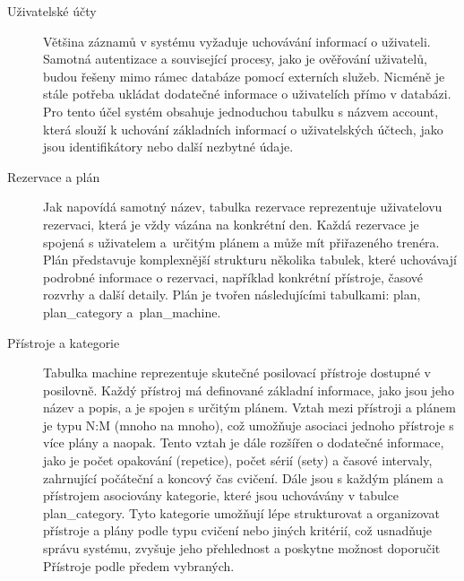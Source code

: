 \begin{description}
    \item[Uživatelské účty] Většina záznamů v systému vyžaduje uchovávání informací o uživateli. Samotná autentizace a související procesy, jako je ověřování uživatelů, budou řešeny mimo rámec databáze pomocí externích služeb. Nicméně je stále potřeba ukládat dodatečné informace o uživatelích přímo v databázi. Pro tento účel systém obsahuje jednoduchou tabulku s názvem account, která slouží k uchování základních informací o uživatelských účtech, jako jsou identifikátory nebo další nezbytné údaje.
    \item[Rezervace a plán] Jak napovídá samotný název, tabulka rezervace reprezentuje uživatelovu rezervaci, která je vždy vázána na konkrétní den. Každá rezervace je spojená s uživatelem a~určitým plánem a může mít přiřazeného trenéra. Plán představuje komplexnější strukturu několika tabulek, které uchovávají podrobné informace o rezervaci, například konkrétní přístroje, časové rozvrhy a další detaily. Plán je tvořen následujícími tabulkami: plan, plan\_category a~plan\_machine.
    \item[Přístroje a kategorie] Tabulka machine reprezentuje skutečné posilovací přístroje dostupné v posilovně. Každý přístroj má definované základní informace, jako jsou jeho název a popis, a je spojen s určitým plánem. Vztah mezi přístroji a plánem je typu N:M (mnoho na mnoho), což umožňuje asociaci jednoho přístroje s více plány a naopak. Tento vztah je dále rozšířen o dodatečné informace, jako je počet opakování (repetice), počet sérií (sety) a časové intervaly, zahrnující počáteční a koncový čas cvičení. Dále jsou s každým plánem a přístrojem asociovány kategorie, které jsou uchovávány v tabulce plan\_category. Tyto kategorie umožňují lépe strukturovat a organizovat přístroje a plány podle typu cvičení nebo jiných kritérií, což usnadňuje správu systému, zvyšuje jeho přehlednost a poskytne možnost doporučit Přístroje podle předem vybraných.
\end{description}
